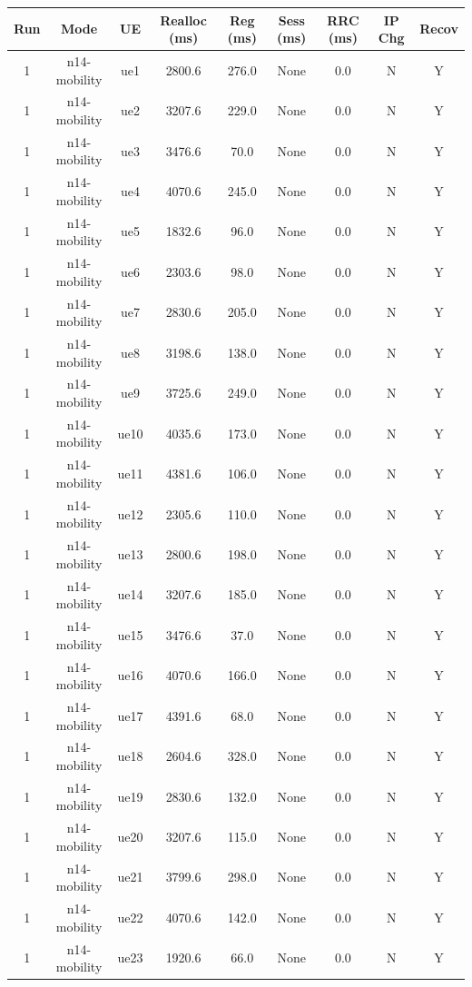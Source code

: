 \begin{table}[ht]
\centering
\begin{tabular}{|c|c|c|c|c|c|c|c|c|}
\hline
Run & Mode & UE & Realloc (ms) & Reg (ms) & Sess (ms) & RRC (ms) & IP Chg & Recov \\
\hline
1 & n14-mobility & ue1 & 2800.6 & 276.0 & None & 0.0 & N & Y \\
1 & n14-mobility & ue2 & 3207.6 & 229.0 & None & 0.0 & N & Y \\
1 & n14-mobility & ue3 & 3476.6 & 70.0 & None & 0.0 & N & Y \\
1 & n14-mobility & ue4 & 4070.6 & 245.0 & None & 0.0 & N & Y \\
1 & n14-mobility & ue5 & 1832.6 & 96.0 & None & 0.0 & N & Y \\
1 & n14-mobility & ue6 & 2303.6 & 98.0 & None & 0.0 & N & Y \\
1 & n14-mobility & ue7 & 2830.6 & 205.0 & None & 0.0 & N & Y \\
1 & n14-mobility & ue8 & 3198.6 & 138.0 & None & 0.0 & N & Y \\
1 & n14-mobility & ue9 & 3725.6 & 249.0 & None & 0.0 & N & Y \\
1 & n14-mobility & ue10 & 4035.6 & 173.0 & None & 0.0 & N & Y \\
1 & n14-mobility & ue11 & 4381.6 & 106.0 & None & 0.0 & N & Y \\
1 & n14-mobility & ue12 & 2305.6 & 110.0 & None & 0.0 & N & Y \\
1 & n14-mobility & ue13 & 2800.6 & 198.0 & None & 0.0 & N & Y \\
1 & n14-mobility & ue14 & 3207.6 & 185.0 & None & 0.0 & N & Y \\
1 & n14-mobility & ue15 & 3476.6 & 37.0 & None & 0.0 & N & Y \\
1 & n14-mobility & ue16 & 4070.6 & 166.0 & None & 0.0 & N & Y \\
1 & n14-mobility & ue17 & 4391.6 & 68.0 & None & 0.0 & N & Y \\
1 & n14-mobility & ue18 & 2604.6 & 328.0 & None & 0.0 & N & Y \\
1 & n14-mobility & ue19 & 2830.6 & 132.0 & None & 0.0 & N & Y \\
1 & n14-mobility & ue20 & 3207.6 & 115.0 & None & 0.0 & N & Y \\
1 & n14-mobility & ue21 & 3799.6 & 298.0 & None & 0.0 & N & Y \\
1 & n14-mobility & ue22 & 4070.6 & 142.0 & None & 0.0 & N & Y \\
1 & n14-mobility & ue23 & 1920.6 & 66.0 & None & 0.0 & N & Y \\

\end{tabular}
\end{table}
